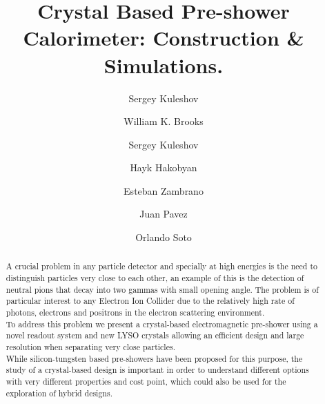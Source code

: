 \documentclass[final,5p,times,twocolumn]{elsarticle}
\begin{document}
%
\begin{frontmatter}
%
%
%
\title{Crystal Based Pre-shower Calorimeter: Construction \& Simulations.}
%
%
\author[A]{Sergey Kuleshov} 
\author[A]{William K. Brooks}
\author[A]{Sergey Kuleshov}
\author[A]{Hayk Hakobyan}	
\author[A]{Esteban Zambrano}
\author[A]{Juan Pavez}
\author[A]{Orlando Soto}
\address[A]{Universidad T\'ecnica Federico Santa Mar\'ia, Valpara\'iso, Chile}
%
\begin{abstract}
A crucial problem in any particle detector and specially at high energies is the need to distinguish particles very close to each other, an example of this is the detection of neutral pions that decay into two gammas with small opening angle. The problem is of particular interest to any Electron Ion Collider due to the relatively high rate of photons, electrons and positrons in the electron scattering environment.\\

To address this problem we present a crystal-based electromagnetic pre-shower using a novel readout system and new LYSO crystals allowing an efficient design and large resolution when separating very close particles. \\

While silicon-tungsten based pre-showers have been proposed for this purpose, the study of a crystal-based design is important in order to understand different options with very different properties and cost point, which could also be used for the exploration of hybrid designs. 


\end{abstract}
\end{frontmatter}
\end{document}
